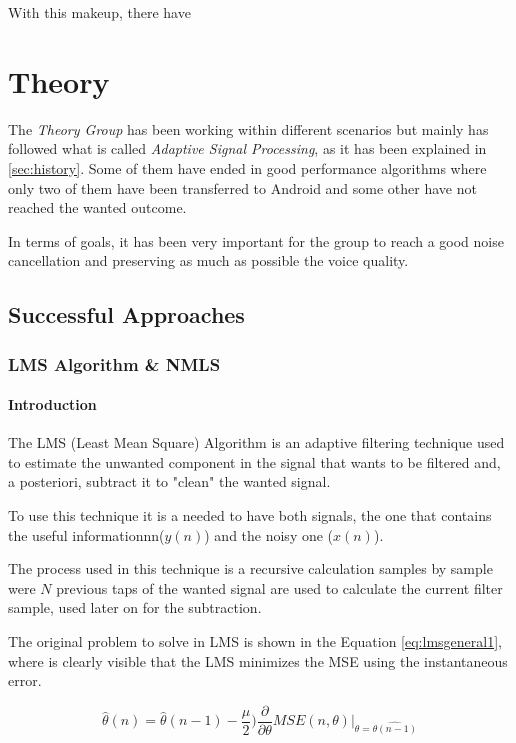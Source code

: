 \documentclass[11pt,a4paper,spanish]{book}  %
\theoremstyle{definition}  %
\theoremstyle{plain}  %
\theoremstyle{remark}  %
\begin{document}
With this makeup, there have

\chapter{Theory}
\label{sec:theory}

The \textit{Theory Group} has been working within different scenarios but mainly has followed what is called \textit{Adaptive Signal Processing}, as it has been explained in \ref{sec:history}. Some of them have ended in good performance algorithms where only two of them have been transferred to Android and some other have not reached the wanted outcome.

In terms of goals, it has been very important for the group to reach a good noise cancellation and preserving as much as possible the voice quality.

\section{Successful Approaches}

	\subsection{LMS Algorithm \& NMLS}
	
		\subsubsection{Introduction}
	
	The LMS (Least Mean Square) Algorithm is an adaptive filtering technique used to estimate the unwanted component in the signal that wants to be filtered and, a posteriori, subtract it to "clean" the wanted signal.
	
	To use this technique it is a needed to have both signals, the one that contains the useful informationnn($y(n)$) and the noisy one ($x(n)$).
	
	The process used in this technique is a recursive calculation samples by sample were $N$ previous taps of the wanted signal are used to calculate the current filter sample, used later on for the subtraction.
	
	The original problem to solve in LMS is shown in the Equation \ref{eq:lmsgeneral1}, where is clearly visible that the LMS minimizes the MSE using the instantaneous error.
	
		\begin{equation}
	\label{eq:lmsgeneral1}
		\hat{\theta}(n) = \hat{\theta}(n-1) -\frac{\mu}{2})\frac{\partial}{\partial \theta}MSE(n,\theta)\rvert_{\theta=\hat{\theta(n-1)}}
	\end{equation}
	
\end{document}
